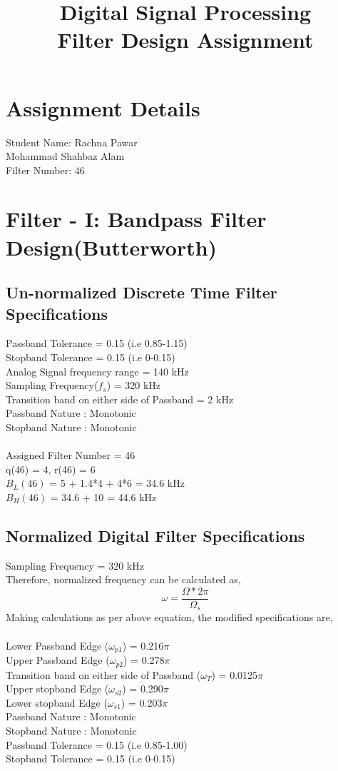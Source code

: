 \documentclass[12pt]{article}
\title{Digital Signal Processing 
   \\ Filter Design Assignment}
\begin{document}
\maketitle
\section{Assignment Details}
Student Name: \newline 
              Rachna Pawar\\
              Mohammad Shahbaz Alam\\
Filter Number: 46\\


\section{Filter - I: Bandpass Filter Design(Butterworth) }
\subsection{Un-normalized Discrete Time Filter Specifications}
Passband Tolerance = 0.15 (i.e 0.85-1.15)\\
Stopband Tolerance = 0.15 (i.e 0-0.15)\\
Analog Signal frequency range = 140 kHz\\
Sampling Frequency($f_s$) = 320 kHz\\
Transition band on either side of Passband = 2 kHz\\ 
Passband Nature : Monotonic\\
Stopband Nature : Monotonic\\\\
Assigned Filter Number = 46\\
q(46) = 4, r(46) = 6\\
$B_L(46)$ = 5 + 1.4*4 + 4*6 = 34.6 kHz\\
$B_H(46)$ = 34.6 + 10 = 44.6 kHz
\subsection{Normalized Digital Filter Specifications}
Sampling Frequency = 320 kHz\\
Therefore, normalized frequency can be calculated as,
\begin{equation}
    \omega = \frac{\Omega*2\pi}{\Omega_s}
\end{equation}
Making calculations as per above equation, the modified specifications are,
\\\\
Lower Passband Edge ($\omega_{p1}$) = 0.216$\pi$\\
Upper Passband Edge ($\omega_{p2}$) = 0.278$\pi$\\
Transition band on either side of Passband ($\omega_T$) = 0.0125$\pi$ 
\\Upper stopband Edge ($\omega_{s2}$) = 0.290$\pi$\\
Lower stopband Edge ($\omega_{s1}$) = 0.203$\pi$\\
Passband Nature : Monotonic\\
Stopband Nature : Monotonic\\
Passband Tolerance = 0.15 (i.e 0.85-1.00)\\
Stopband Tolerance = 0.15 (i.e 0-0.15)
\end{document}

